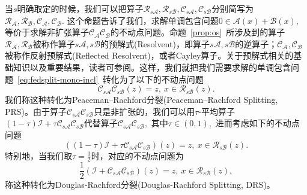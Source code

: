 当$s$明确取定的时候，我们可以把算子$\mathcal{R}_{s\mathcal{A}}, \mathcal{R}_{s\mathcal{B}}, \mathcal{C}_{s\mathcal{A}}, \mathcal{C}_{s\mathcal{B}}$分别简写为$\mathcal{R}_{\mathcal{A}}, \mathcal{R}_{\mathcal{B}}, \mathcal{C}_{\mathcal{A}}, \mathcal{C}_{\mathcal{B}}.$ 这个命题告诉了我们，求解单调包含问题$0 \in \mathcal{A}(x) + \mathcal{B}(x),$等价于求解非扩张算子$\mathcal{C}_{\mathcal{A}} \mathcal{C}_{\mathcal{B}}$的不动点问题。命题~\ref{prop:os}~所涉及到的算子$\mathcal{R}_{\mathcal{A}}, \mathcal{R}_{\mathcal{B}}$被称作算子$s\mathcal{A}, s\mathcal{B}$的预解式(Resolvent)，即算子$s\mathcal{A}, s\mathcal{B}$的逆算子；$\mathcal{C}_{\mathcal{A}}, \mathcal{C}_{\mathcal{B}}$被称作反射预解式(Reflected Resolvent)，或者Cayley算子。关于预解式相关的基础知识以及重要结果，读者可参阅\parencite[\S 2.5]{ryu2022large}。这样，我们就把我们需要求解的单调包含问题~\eqref{eq:fedsplit-mono-incl}~转化为了以下的不动点问题
\begin{equation}
\label{eq:fixed-pt-pr}
\mathcal{C}_{s\mathcal{A}} \mathcal{C}_{s\mathcal{B}} (z) = z, ~ x \in \mathcal{R}_{s\mathcal{B}} (z).
\end{equation}
我们称这种转化为Peaceman–Rachford分裂(Peaceman–Rachford Splitting, PRS)。由于算子$\mathcal{C}_{s\mathcal{A}} \mathcal{C}_{s\mathcal{B}}$只是非扩张的，我们可以用$\tau$-平均算子$(1 - \tau) \mathcal{I} + \tau \mathcal{C}_{s\mathcal{A}} \mathcal{C}_{s\mathcal{B}}$代替算子$\mathcal{C}_{s\mathcal{A}} \mathcal{C}_{s\mathcal{B}},$ 其中$\tau \in (0, 1),$ 进而考虑如下的不动点问题
\begin{equation}
\label{eq:fixed-pt-general}
((1 - \tau) \mathcal{I} + \tau \mathcal{C}_{s\mathcal{A}} \mathcal{C}_{s\mathcal{B}}) (z) = z, ~ x \in \mathcal{R}_{s\mathcal{B}} (z).
\end{equation}
特别地，当我们取$\tau = \frac{1}{2}$时，对应的不动点问题为
\begin{equation}
\label{eq:fixed-pt-dr}
\frac{1}{2}(\mathcal{I} + \mathcal{C}_{s\mathcal{A}} \mathcal{C}_{s\mathcal{B}}) (z) = z, ~ x \in \mathcal{R}_{s\mathcal{B}} (z),
\end{equation}
称这种转化为Douglas-Rachford分裂(Douglas-Rachford Splitting, DRS)。

